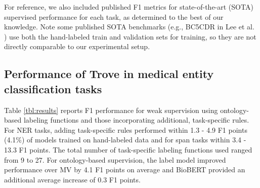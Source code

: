 \documentclass{article}
\begin{document}
For reference, we also included published F1 metrics for state-of-the-art (SOTA) supervised performance for each task, as determined to the best of our knowledge. 
Note some published SOTA benchmarks (e.g., BC5CDR in Lee et al. \cite{Lee2019-xt}) use both the hand-labeled train and validation sets for training, so they are not directly comparable to our experimental setup. 


\subsection*{Performance of Trove in medical entity classification tasks}
Table \ref{tbl:results} reports F1 performance for weak supervision using ontology-based labeling functions and those incorporating additional, task-specific rules. 
For NER tasks, adding task-specific rules performed within {1.3 - 4.9} F1 points (4.1\%) of models trained on hand-labeled data and for span tasks within 3.4 - 13.3 F1 points. 
The total number of task-specific labeling functions used ranged from 9 to 27. 
For ontology-based supervision, the label model improved performance over MV by {4.1} F1 points on average and BioBERT provided an additional average increase of {0.3} F1 points.  
\end{document}

